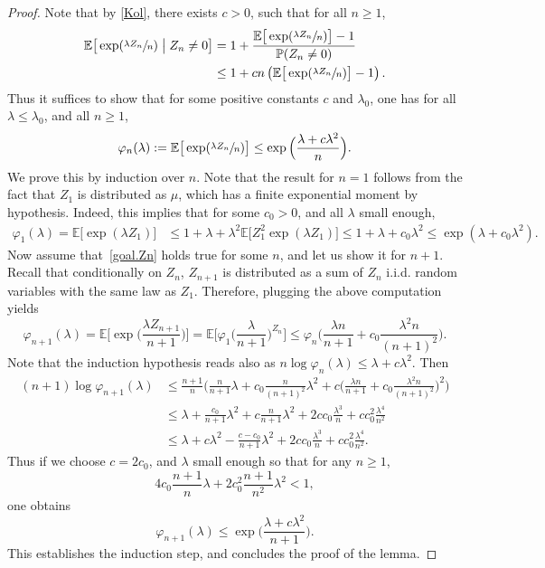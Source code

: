 \documentclass[11pt]{article}
\numberwithin{equation}{section}
\theoremstyle{plain}
\theoremstyle{definition}
\newcommand{\1}{{\text{\Large $\mathfrak 1$}}}
\begin{document}
\begin{proof}
Note that by \eqref{Kol}, there exists $c>0$, such that for all $n\ge 1$,
\begin{align*}
\mathbb E\big[\exp(\sfrac{\lambda Z_n}{n})\bigm| Z_n\neq 0\big] & = 1+ \frac{\mathbb E\big[\exp(\sfrac{\lambda Z_n}{n})\big] - 1}{\mathbb P(Z_n\neq 0)}\\
& \le 1+ cn \left(\mathbb E\big[\exp(\sfrac{\lambda Z_n}{n})\big] - 1\right).
\end{align*}
Thus it suffices to show that for some positive constants $c$ and $\lambda_0$, one has for all $\lambda\le \lambda_0$, and all $n\ge 1$,
\begin{equation}\label{goal.Zn}
\varphi_n(\lambda):=\mathbb E\big[\exp(\sfrac{\lambda Z_n}{n})\big] \le \exp\Big(\frac{\lambda+c\lambda^2}{n}\Big).
\end{equation}
We prove this by induction over $n$. Note that the result for $n=1$ follows from the fact that $Z_1$ is distributed as $\mu$, which
has a finite exponential moment by hypothesis.
Indeed, this implies that for some $c_0>0$, and all $\lambda$ small enough,
\begin{align*}
\varphi_1(\lambda) = \mathbb E\big[\exp(\lambda Z_1)\big] & \le 1 + \lambda+ \lambda^2 \mathbb E\big[Z_1^2\exp(\lambda Z_1)\big] \le 1+ \lambda+
c_0 \lambda^2 \le \exp(\lambda+c_0 \lambda^2).
\end{align*}
Now assume that~\eqref{goal.Zn} holds true for some $n$, and let us show it for $n+1$.
Recall that conditionally on $Z_n$, $Z_{n+1}$ is distributed
as a sum of $Z_n$ i.i.d. random variables with the same law as $Z_1$.
Therefore, plugging the above computation yields
\[
\varphi_{n+1}(\lambda)= \mathbb E\Big[\exp\Big(\frac{\lambda Z_{n+1}}{n+1}\Big)\Big] = \mathbb E\Big[ \varphi_1\Big(\frac{\lambda}{n+1}\Big)^{Z_n}\Big]\le \varphi_n\Big(\frac{\lambda n}{n+1} + c_0\frac{\lambda^2 n}{(n+1)^2}\Big).
\]
Note that the induction hypothesis reads also as
$n\log \varphi_n(\lambda)\le \lambda+ c\lambda^2$. Then
\begin{equation*}%
\begin{split}
(n+1)\log \varphi_{n+1}(\lambda) & \le
\frac{n+1}{n}\Big(\frac{n}{n+1}\lambda+c_0\frac{n}{(n+1)^2}\lambda^2 +
c\Big(\frac{\lambda n}{n+1} + c_0\frac{\lambda^2 n}{(n+1)^2}\Big)^2\Big)\\
& \le \lambda +\frac{c_0}{n+1}\lambda^2+c\frac{n}{n+1}\lambda^2
+ 2cc_0\frac{\lambda^3}{n}+cc_0^2\frac{\lambda^4}{n^2}\\
& \le \lambda+ c\lambda^2-\frac{c-c_0}{n+1}\lambda^2+
2cc_0\frac{\lambda^3}{n}+cc_0^2\frac{\lambda^4}{n^2}.
\end{split}
\end{equation*}
Thus if we choose $c=2c_0$, and $\lambda$ small enough so that
for any $n\ge 1$,
\[
4c_0 \frac{n+1}{n} \lambda+ 2c_0^2\frac{n+1}{n^2} \lambda^2<1,
\]
one obtains
\begin{equation*}
\varphi_{n+1}(\lambda)\le \exp\Big(\frac{\lambda +c\lambda^2}{n+1}\Big).
\end{equation*}
This establishes the induction step, and concludes the proof of the lemma.
\end{proof}
\end{document}
